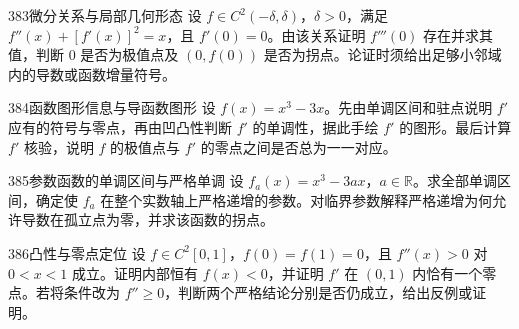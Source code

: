 \begin{exercise}{383}{微分关系与局部几何形态}
设 $f\in C^2(-\delta,\delta)$，$\delta>0$，满足 $f''(x)+[f'(x)]^2=x$，且 $f'(0)=0$。由该关系证明 $f'''(0)$ 存在并求其值，判断 $0$ 是否为极值点及 $(0,f(0))$ 是否为拐点。论证时须给出足够小邻域内的导数或函数增量符号。
\end{exercise}
\begin{exercise}{384}{函数图形信息与导函数图形}
设 $f(x)=x^3-3x$。先由单调区间和驻点说明 $f'$ 应有的符号与零点，再由凹凸性判断 $f'$ 的单调性，据此手绘 $f'$ 的图形。最后计算 $f'$ 核验，说明 $f$ 的极值点与 $f'$ 的零点之间是否总为一一对应。
\end{exercise}
\begin{exercise}{385}{参数函数的单调区间与严格单调}
设 $f_a(x)=x^3-3ax$，$a\in\mathbb R$。求全部单调区间，确定使 $f_a$ 在整个实数轴上严格递增的参数。对临界参数解释严格递增为何允许导数在孤立点为零，并求该函数的拐点。
\end{exercise}
\begin{exercise}{386}{凸性与零点定位}
设 $f\in C^2[0,1]$，$f(0)=f(1)=0$，且 $f''(x)>0$ 对 $0<x<1$ 成立。证明内部恒有 $f(x)<0$，并证明 $f'$ 在 $(0,1)$ 内恰有一个零点。若将条件改为 $f''\ge0$，判断两个严格结论分别是否仍成立，给出反例或证明。
\end{exercise}
